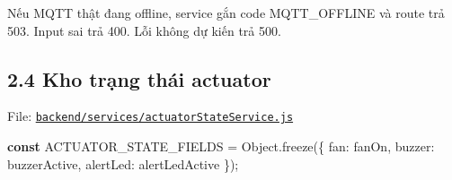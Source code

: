 \documentclass[11pt,oneside,openany]{book}
\renewcommand{\texttt}[1]{{\ttfamily\small #1}}
\newenvironment{Shaded}{\begin{snugshade}}{\end{snugshade}}
\newcommand{\BuiltInTok}[1]{\textcolor[rgb]{0.50,0.55,0.55}{#1}}
\newcommand{\ControlFlowTok}[1]{\textcolor[rgb]{0.99,0.74,0.29}{\textbf{#1}}}
\newcommand{\DataTypeTok}[1]{\textcolor[rgb]{0.16,0.50,0.73}{#1}}
\newcommand{\DecValTok}[1]{\textcolor[rgb]{0.96,0.45,0.00}{#1}}
\newcommand{\FunctionTok}[1]{\textcolor[rgb]{0.56,0.27,0.68}{#1}}
\newcommand{\KeywordTok}[1]{\textcolor[rgb]{0.81,0.81,0.76}{\textbf{#1}}}
\newcommand{\NormalTok}[1]{\textcolor[rgb]{0.81,0.81,0.76}{#1}}
\newcommand{\OperatorTok}[1]{\textcolor[rgb]{0.81,0.81,0.76}{#1}}
\newcommand{\SpecialCharTok}[1]{\textcolor[rgb]{0.24,0.68,0.91}{#1}}
\newcommand{\StringTok}[1]{\textcolor[rgb]{0.96,0.31,0.31}{#1}}
\newcommand{\VerbatimStringTok}[1]{\textcolor[rgb]{0.85,0.27,0.33}{#1}}
\renewenvironment{Shaded}{%
  \def\FrameCommand{\fboxsep=8pt\colorbox{shadecolor}}%
  \MakeFramed{\advance\hsize-\width\FrameRestore}%
}{\endMakeFramed}
\begin{document}
\begin{Shaded}
\end{Shaded}

Nếu MQTT thật đang offline, service gắn code \texttt{MQTT\_OFFLINE} và
route trả 503. Input sai trả 400. Lỗi không dự kiến trả 500.

\subsection{2.4 Kho trạng thái
actuator}\label{24-kho-trux1ea1ng-thuxe1i-actuator}

File:
\href{../backend/services/actuatorStateService.js}{\nolinkurl{backend/services/actuatorStateService.js}}

\begin{Shaded}
\begin{Highlighting}[]
\KeywordTok{const}\NormalTok{ ACTUATOR\_STATE\_FIELDS }\OperatorTok{=} \BuiltInTok{Object}\OperatorTok{.}\FunctionTok{freeze}\NormalTok{(\{}
  \DataTypeTok{fan}\OperatorTok{:} \StringTok{\textquotesingle{}fanOn\textquotesingle{}}\OperatorTok{,}
  \DataTypeTok{buzzer}\OperatorTok{:} \StringTok{\textquotesingle{}buzzerActive\textquotesingle{}}\OperatorTok{,}
  \DataTypeTok{alertLed}\OperatorTok{:} \StringTok{\textquotesingle{}alertLedActive\textquotesingle{}}
\NormalTok{\})}\OperatorTok{;}
\end{Highlighting}
\end{Shaded}
\end{document}
